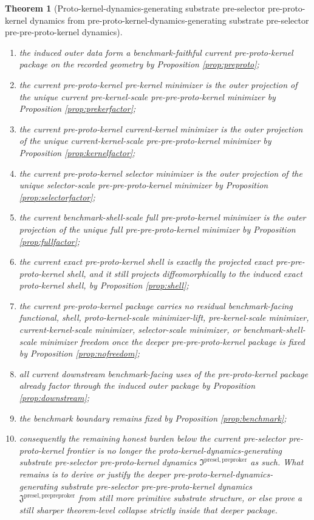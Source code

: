 \documentclass[11pt]{article}
\newcommand{\PreProtoKernelPackage}{\mathfrak I^{\mathrm{presel,preproker}}}
\newcommand{\PrePreProtoKernelPackage}{\mathfrak J^{\mathrm{presel,prepreproker}}}
\newtheorem{theorem}{Theorem}
\begin{document}
\begin{theorem}[Proto-kernel-dynamics-generating substrate pre-selector pre-proto-kernel dynamics from pre-proto-kernel-dynamics-generating substrate pre-selector pre-pre-proto-kernel dynamics]
\begin{enumerate}
    \item the induced outer data form a benchmark-faithful current pre-proto-kernel package on the recorded geometry by Proposition \ref{prop:preproto};
    \item the current pre-proto-kernel pre-kernel minimizer is the outer projection of the unique current pre-kernel-scale pre-pre-proto-kernel minimizer by Proposition \ref{prop:prekerfactor};
    \item the current pre-proto-kernel current-kernel minimizer is the outer projection of the unique current-kernel-scale pre-pre-proto-kernel minimizer by Proposition \ref{prop:kernelfactor};
    \item the current pre-proto-kernel selector minimizer is the outer projection of the unique selector-scale pre-pre-proto-kernel minimizer by Proposition \ref{prop:selectorfactor};
    \item the current benchmark-shell-scale full pre-proto-kernel minimizer is the outer projection of the unique full pre-pre-proto-kernel minimizer by Proposition \ref{prop:fullfactor};
    \item the current exact pre-proto-kernel shell is exactly the projected exact pre-pre-proto-kernel shell, and it still projects diffeomorphically to the induced exact proto-kernel shell, by Proposition \ref{prop:shell};
    \item the current pre-proto-kernel package carries no residual benchmark-facing functional, shell, proto-kernel-scale minimizer-lift, pre-kernel-scale minimizer, current-kernel-scale minimizer, selector-scale minimizer, or benchmark-shell-scale minimizer freedom once the deeper pre-pre-proto-kernel package is fixed by Proposition \ref{prop:nofreedom};
    \item all current downstream benchmark-facing uses of the pre-proto-kernel package already factor through the induced outer package by Proposition \ref{prop:downstream};
    \item the benchmark boundary remains fixed by Proposition \ref{prop:benchmark};
    \item consequently the remaining honest burden below the current pre-selector pre-proto-kernel frontier is no longer the proto-kernel-dynamics-generating substrate pre-selector pre-proto-kernel dynamics \(\PreProtoKernelPackage\) as such. What remains is to derive or justify the deeper pre-proto-kernel-dynamics-generating substrate pre-selector pre-pre-proto-kernel dynamics \(\PrePreProtoKernelPackage\) from still more primitive substrate structure, or else prove a still sharper theorem-level collapse strictly inside that deeper package.
\end{enumerate}
\end{theorem}
\end{document}
